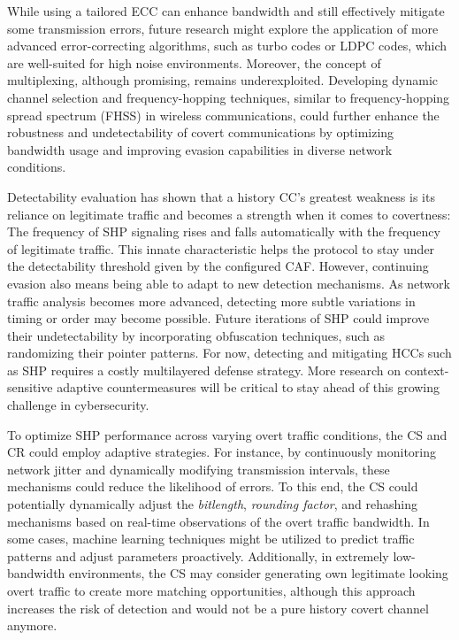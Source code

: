 \documentclass[journal]{IEEEtran}
\begin{document}
While using a tailored \ac{ECC} can enhance bandwidth and still effectively mitigate some transmission errors, future research might explore the application of more advanced error-correcting algorithms, such as turbo codes or LDPC codes, which are well-suited for high noise environments. Moreover, the concept of multiplexing, although promising, remains underexploited. Developing dynamic channel selection and frequency-hopping techniques, similar to frequency-hopping spread spectrum (FHSS) in wireless communications, could further enhance the robustness and undetectability of covert communications by optimizing bandwidth usage and improving evasion capabilities in diverse network conditions.

Detectability evaluation has shown that a history \ac{CC}'s greatest weakness is its reliance on legitimate traffic and becomes a strength when it comes to covertness: The frequency of \ac{SHP} signaling rises and falls automatically with the frequency of legitimate traffic. This innate characteristic helps the protocol to stay under the detectability threshold given by the configured \ac{CAF}. However, continuing evasion also means being able to adapt to new detection mechanisms. As network traffic analysis becomes more advanced, detecting more subtle variations in timing or order may become possible. Future iterations of \ac{SHP} could improve their undetectability by incorporating obfuscation techniques, such as randomizing their pointer patterns. For now, detecting and mitigating \ac{HCC}s such as \ac{SHP} requires a costly multilayered defense strategy. More research on context-sensitive adaptive countermeasures will be critical to stay ahead of this growing challenge in cybersecurity.

To optimize \ac{SHP} performance across varying overt traffic conditions, the \ac{CS} and \ac{CR} could employ adaptive strategies. For instance, by continuously monitoring network jitter and dynamically modifying transmission intervals, these mechanisms could reduce the likelihood of errors. To this end, the \ac{CS} could potentially dynamically adjust the \textit{bitlength}, \textit{rounding factor}, and {rehashing} mechanisms based on real-time observations of the overt traffic bandwidth. In some cases, machine learning techniques might be utilized to predict traffic patterns and adjust parameters proactively. Additionally, in extremely low-bandwidth environments, the \ac{CS} may consider generating own legitimate looking overt traffic to create more matching opportunities, although this approach increases the risk of detection and would not be a pure history covert channel anymore.
\end{document}
